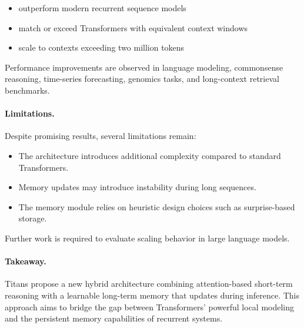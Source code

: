 \documentclass[12pt]{article}
\begin{document}
\begin{itemize}
		\item outperform modern recurrent sequence models
		\item match or exceed Transformers with equivalent context windows
		\item scale to contexts exceeding two million tokens
\end{itemize}

Performance improvements are observed in language modeling, commonsense reasoning,
time-series forecasting, genomics tasks, and long-context retrieval benchmarks. \cite{titans}

\paragraph{Limitations.}
Despite promising results, several limitations remain:

\begin{itemize}
		\item The architecture introduces additional complexity compared to standard Transformers.
		\item Memory updates may introduce instability during long sequences.
		\item The memory module relies on heuristic design choices such as surprise-based storage.
\end{itemize}

Further work is required to evaluate scaling behavior in large language models.

\paragraph{Takeaway.}
Titans propose a new hybrid architecture combining attention-based short-term reasoning with
a learnable long-term memory that updates during inference. This approach aims to bridge the gap
between Transformers' powerful local modeling and the persistent memory capabilities of recurrent systems.
\end{document}

